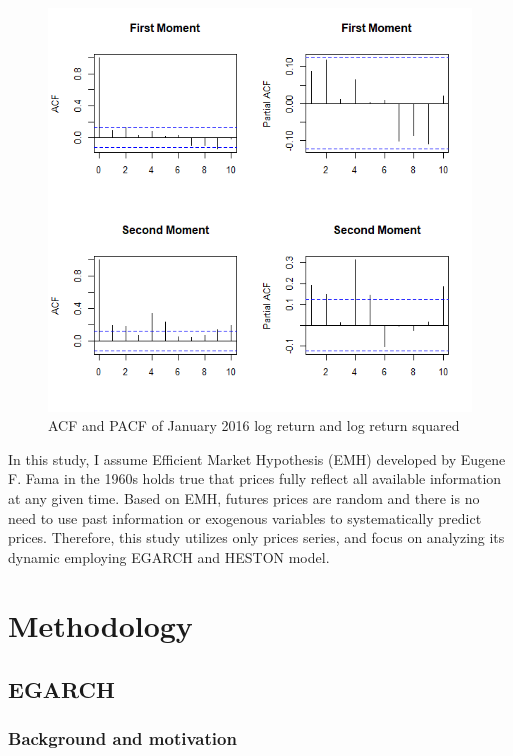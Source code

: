 \documentclass[12pt,a4paper]{article}
\numberwithin{equation}{section}
\begin{document}
\begin{figure}[h!] 
\includegraphics[scale=1,width=1\linewidth,height=0.4\textheight]{Jan16_pacf.png}
\caption{ACF and PACF of January 2016 log return and log return squared}
\label{Jan16pacf}
\end{figure}

In this study, I assume Efficient Market Hypothesis (EMH) developed by Eugene F. Fama in the 1960s holds true that prices fully reflect all available information at any given time. Based on EMH, futures prices are random and there is no need to use past information or exogenous variables to systematically predict prices. Therefore, this study utilizes only prices series, and focus on analyzing its dynamic employing EGARCH and HESTON model.

\section{Methodology}

\subsection{EGARCH}


\subsubsection{Background and motivation}
\end{document}
